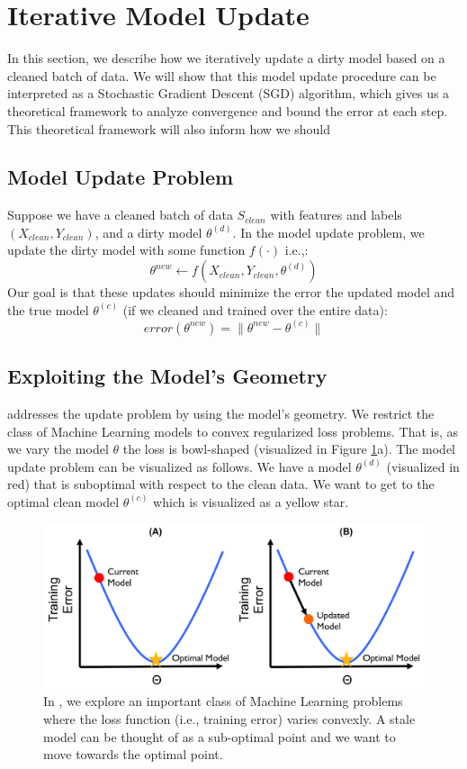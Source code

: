 \section{Iterative Model Update}
In this section, we describe how we iteratively update a dirty model based on
a cleaned batch of data.
We will show that this model update procedure can be interpreted as a Stochastic 
Gradient Descent (SGD) algorithm, which gives us a theoretical framework to analyze
convergence and bound the error at each step.
This theoretical framework will also inform how we should 

\subsection{Model Update Problem}
Suppose we have a cleaned batch of data $S_{clean}$ with features and labels $(X_{clean},Y_{clean})$, and a dirty model $\theta^{(d)}$. 
In the model update problem, we update the dirty model with some function $f(\cdot)$ i.e.,:
\[
\theta^{new} \leftarrow f(X_{clean},Y_{clean},\theta^{(d)})
\]
Our goal is that these updates should minimize the error the updated model and the true model $\theta^{(c)}$ (if we cleaned and trained over the entire data):
\[
error(\theta^{new}) = \| \theta^{new} - \theta^{(c)} \|
\]

\subsection{Exploiting the Model's Geometry}
\sys addresses the update problem by using the model's geometry.
We restrict the class of Machine Learning models to convex regularized loss problems.
That is, as we vary the model $\theta$ the loss is bowl-shaped (visualized in Figure \ref{update-arch2}a).
The model update problem can be visualized as follows.
We have a model $\theta^{(d)}$ (visualized in red) that is suboptimal with respect to the clean data.
We want to get to the optimal clean model $\theta^{(c)}$ which is visualized as a yellow star.

\begin{figure}[ht!]
\centering
 \includegraphics[width=\columnwidth]{figs/update-arch2.png}
 \caption{In \sys, we explore an important class of Machine Learning problems where the loss function (i.e., training error) varies convexly. A stale model can be thought of as a sub-optimal point and we want to move towards the optimal point. \label{update-arch2}}
\end{figure}

